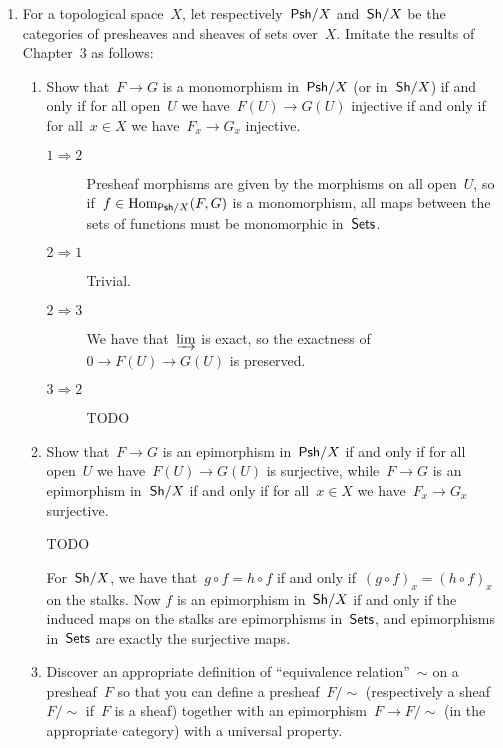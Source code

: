 \documentclass[a4paper,11pt,oneside,openany,article]{memoir}
\begin{document}
\begin{enumerate}
  \item For a topological space~$X$, let respectively~$\mathsf{Psh}/X$ and~$\mathsf{Sh}/X$ be the categories of presheaves and sheaves of sets over~$X$. Imitate the results of Chapter~$3$ as follows:
    \begin{enumerate}
      \item Show that~$F\to G$ is a monomorphism in~$\mathsf{Psh}/X$ (or in~$\mathsf{Sh}/X$) if and only if for all open~$U$ we have~$F(U)\to G(U)$ injective if and only if for all~$x\in X$ we have~$F_x\to G_x$ injective.

        \begin{solution}
          \begin{description}
            \item[$1\Rightarrow 2$] Presheaf morphisms are given by the morphisms on all open~$U$, so if~$f\in\operatorname{Hom}_{\mathsf{Psh}/X}(F,G)$ is a monomorphism, all maps between the sets of functions must be monomorphic in~$\textsf{Sets}$.
            \item[$2\Rightarrow 1$] Trivial.
            \item[$2\Rightarrow 3$] We have that~$\varinjlim$ is exact, so the exactness of~$0\to F(U)\to G(U)$ is preserved.
            \item[$3\Rightarrow 2$] TODO
          \end{description}
        \end{solution}

      \item Show that~$F\to G$ is an epimorphism in~$\mathsf{Psh}/X$ if and only if for all open~$U$ we have~$F(U)\to G(U)$ is surjective, while~$F\to G$ is an epimorphism in~$\mathsf{Sh}/X$ if and only if for all~$x\in X$ we have~$F_x\to G_x$ surjective.
        
        \begin{solution}
          TODO

          For~$\mathsf{Sh}/X$, we have that~$g\circ f=h\circ f$ if and only if~$(g\circ f)_x=(h\circ f)_x$ on the stalks. Now $f$ is an epimorphism in~$\mathsf{Sh}/X$ if and only if the induced maps on the stalks are epimorphisms in~$\textsf{Sets}$, and epimorphisms in~$\textsf{Sets}$ are exactly the surjective maps.
        \end{solution}

      \item Discover an appropriate definition of ``equivalence relation''~$\sim$ on a presheaf~$F$ so that you can define a presheaf~$F/\sim$ (respectively a sheaf~$F/\sim$ if~$F$ is a sheaf) together with an epimorphism~$F\to F/\sim$ (in the appropriate category) with a universal property.


\end{enumerate}
\end{enumerate}
\end{document}
